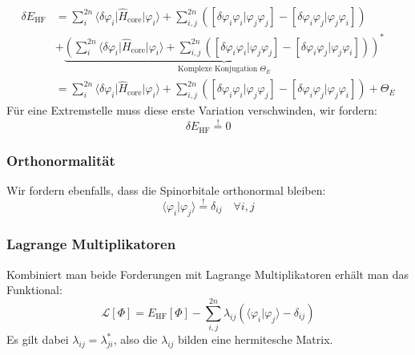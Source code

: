 \begin{equation}\label{E_HF}
  \begin{split}
  \delta E_\textrm{HF} &=
  \sum_i^{2n} \langle \delta \varphi_i \vert \hat{H}_{\text{core}} \vert \varphi_i \rangle
  + \sum_{i, j}^{2n} \left( 
    \left[ \delta \varphi_i \varphi_i \vert \varphi_j \varphi_j \right]
  - \left[ \delta \varphi_i \varphi_j \vert \varphi_j \varphi_i \right]
  \right)\\
  &+ \underbrace{\left( \sum_i^{2n} \langle \delta \varphi_i \vert \hat{H}_{\text{core}} \vert \varphi_i \rangle
  + \sum_{i, j}^{2n} \left( 
    \left[ \delta \varphi_i \varphi_i \vert \varphi_j \varphi_j \right]
  - \left[ \delta \varphi_i \varphi_j \vert \varphi_j \varphi_i \right]
  \right)\right)^*}_\textrm{Komplexe Konjugation $\Theta_E$}\\
  &= 
  \sum_i^{2n} \langle \delta \varphi_i \vert \hat{H}_{\text{core}} \vert \varphi_i \rangle
  + \sum_{i, j}^{2n} \left( 
    \left[ \delta \varphi_i \varphi_i \vert \varphi_j \varphi_j \right]
  - \left[ \delta \varphi_i \varphi_j \vert \varphi_j \varphi_i \right]
  \right) + \Theta_E
  \end{split}
\end{equation}
Für eine Extremstelle muss diese erste Variation verschwinden, wir fordern:
\begin{equation}
  \delta E_\textrm{HF} \overset{!}{=} 0
\end{equation}

\subsubsection*{Orthonormalität}
Wir fordern ebenfalls, dass die Spinorbitale orthonormal bleiben:
\begin{equation}
  \langle \varphi_i \vert \varphi_j \rangle \overset{!}{=} \delta_{ij}\quad \forall i,j
\end{equation}

\subsubsection*{Lagrange Multiplikatoren}
Kombiniert man beide Forderungen mit Lagrange Multiplikatoren erhält man das Funktional:
\begin{equation}
  \mathcal{L}[\Phi] = E_\textrm{HF}[\Phi]
  - \sum_{i,j}^{2n} \lambda_{ij}(\langle \varphi_i \vert \varphi_j \rangle - \delta_{ij})
\end{equation}
Es gilt dabei $\lambda_{ij} = \lambda_{ji}^*$,
also die $\lambda_{ij}$ bilden eine hermitesche Matrix. \cite[3.40]{szabo_ostlund_1996}

